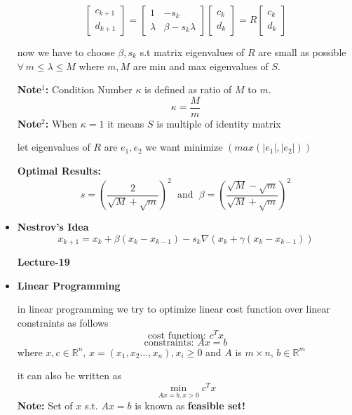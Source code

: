 \documentclass[a4paper]{article}
\numberwithin{equation}{section}
\begin{document}
\begin{itemize}
\[\]
\[
\begin{bmatrix}
    c_{k+1}\\d_{k+1}
\end{bmatrix}=
\begin{bmatrix}
    1&-s_k\\\lambda &\beta-s_k\lambda
\end{bmatrix}
\begin{bmatrix}
    c_{k}\\d_{k}
\end{bmatrix}=R
\begin{bmatrix}
    c_{k}\\d_{k}
\end{bmatrix}
\]

now we have to choose $\beta,s_k$ s.t matrix eigenvalues of $R$ are small as possible $\forall \hspace{2pt}m\leq \lambda \leq M$ where $m,M$ are min and max eigenvalues of $S$.

\textbf{Note$^1$:} Condition Number $\kappa$ is defined as ratio of $M$ to $m$.
\begin{equation}
    \boxed{\kappa =\frac{M}{m}} \tag{Condition Number}
\end{equation}
\textbf{Note$^2$:} When $\kappa=1$ it means $S$ is multiple of identity matrix

let eigenvalues of $R$ are $e_1,e_2$ we want minimize $(max(\vert e_1\vert,\vert e_2\vert))$

\textbf{Optimal Results:}
\[s=\left(\frac{2}{\sqrt{M}+\sqrt{m}}\right)^2 \hspace{7pt}\text{and} \hspace{7pt}\beta=\left(\frac{\sqrt{M}-\sqrt{m}}{\sqrt{M}+\sqrt{m}}\right)^2\]

\item \textbf{Nestrov's Idea}
\[\boxed{x_{k+1}=x_k+\beta (x_k-x_{k-1})-s_k \nabla(x_k+\gamma(x_k-x_{k-1}))}\]

\begin{center}
    \textbf{\Huge{Lecture-19}}
\end{center}

\item \textbf{Linear Programming}

in linear programming we try to optimize linear cost function over linear constraints as follows
\[\text{cost function: } c^Tx \]
\[\text{constraints: } Ax=b\]
where $x,c\in \mathbb{R}^n$, $x=(x_1,x_2\dots,x_n),x_i\geq0$ and $A$ is $m \times n$, $b\in \mathbb{R}^m$

it can also be written as 
\[\min_{Ax=b,x>0} c^Tx\]
\textbf{Note: }Set of $x$ s.t. $Ax=b$ is known as \textbf{feasible set!}


\end{itemize}
\end{document}

